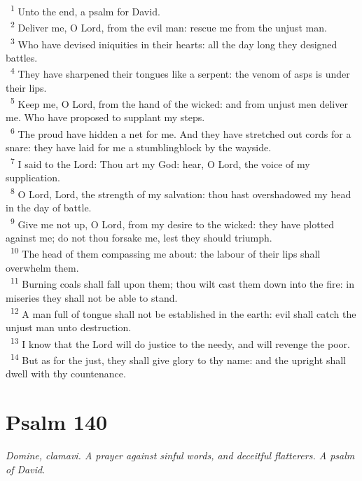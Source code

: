 \documentclass[a5paper,12pt]{article}
\begin{document}
\begin{multicols*}{2}
~\textsuperscript{1} Unto the end, a psalm for David.\\
~\textsuperscript{2} Deliver me, O Lord, from the evil man: rescue me from the unjust man.\\
~\textsuperscript{3} Who have devised iniquities in their hearts: all the day long they designed battles.\\
~\textsuperscript{4} They have sharpened their tongues like a serpent: the venom of asps is under their lips.\\
~\textsuperscript{5} Keep me, O Lord, from the hand of the wicked: and from unjust men deliver me. Who have proposed to supplant my steps.\\
~\textsuperscript{6} The proud have hidden a net for me. And they have stretched out cords for a snare: they have laid for me a stumblingblock by the wayside.\\
~\textsuperscript{7} I said to the Lord: Thou art my God: hear, O Lord, the voice of my supplication.\\
~\textsuperscript{8} O Lord, Lord, the strength of my salvation: thou hast overshadowed my head in the day of battle.\\
~\textsuperscript{9} Give me not up, O Lord, from my desire to the wicked: they have plotted against me; do not thou forsake me, lest they should triumph.\\
~\textsuperscript{10} The head of them compassing me about: the labour of their lips shall overwhelm them.\\
~\textsuperscript{11} Burning coals shall fall upon them; thou wilt cast them down into the fire: in miseries they shall not be able to stand.\\
~\textsuperscript{12} A man full of tongue shall not be established in the earth: evil shall catch the unjust man unto destruction.\\
~\textsuperscript{13} I know that the Lord will do justice to the needy, and will revenge the poor.\\
~\textsuperscript{14} But as for the just, they shall give glory to thy name: and the upright shall dwell with thy countenance.\\

\section{Psalm 140}
\label{sec:orge7a2ebc}
\emph{Domine, clamavi. A prayer against sinful words, and deceitful flatterers. A psalm of David.}\\


\end{multicols*}
\end{document}
